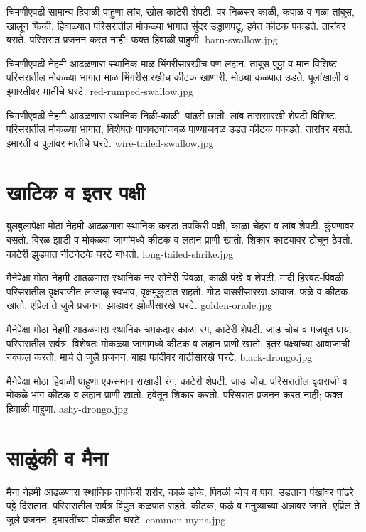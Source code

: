 \documentclass[aspectratio=169]{beamer}
\begin{document}
{चिमणीएवढी}
{सामान्य हिवाळी पाहुणा}
{लांब, खोल काटेरी शेपटी. वर निळसर-काळी, कपाळ व गळा तांबूस, खालून फिकी.}
{हिवाळ्यात परिसरातील मोकळ्या भागात}
{सुंदर उड्डाणपटू, हवेत कीटक पकडते. तारांवर बसते.}
{परिसरात प्रजनन करत नाही; फक्त हिवाळी पाहुणी.}
{barn-swallow.jpg}

{चिमणीएवढी}
{नेहमी आढळणारा स्थानिक}
{माळ भिंगरीसारखीच पण लहान. तांबूस पुठ्ठा व मान विशिष्ट.}
{परिसरातील मोकळ्या भागात}
{माळ भिंगरीसारखीच कीटक खाणारी. मोठ्या कळपात उडते.}
{पूलांखाली व इमारतींवर मातीचे घरटे.}
{red-rumped-swallow.jpg}

{चिमणीएवढी}
{नेहमी आढळणारा स्थानिक}
{निळी-काळी, पांढरी छाती. लांब तारासारखी शेपटी विशिष्ट.}
{परिसरातील मोकळ्या भागात, विशेषतः पाणवठ्यांजवळ}
{पाण्याजवळ उडत कीटक पकडते. तारांवर बसते.}
{इमारती व पुलांवर मातीचे घरटे.}
{wire-tailed-swallow.jpg}

\section{खाटिक व इतर पक्षी}
{बुलबुलापेक्षा मोठा}
{नेहमी आढळणारा स्थानिक}
{करडा-तपकिरी पक्षी, काळा चेहरा व लांब शेपटी. कुंपणावर बसतो.}
{विरळ झाडी व मोकळ्या जागांमध्ये}
{कीटक व लहान प्राणी खातो. शिकार काट्यावर टोचून ठेवतो.}
{काटेरी झुडपात नीटनेटके घरटे बांधतो.}
{long-tailed-shrike.jpg}

{मैनेपेक्षा मोठा}
{नेहमी आढळणारा स्थानिक}
{नर सोनेरी पिवळा, काळी पंखे व शेपटी. मादी हिरवट-पिवळी.}
{परिसरातील वृक्षराजीत}
{लाजाळू स्वभाव, वृक्षमुकुटात राहतो. गोड बासरीसारखा आवाज. फळे व कीटक खातो.}
{एप्रिल ते जुलै प्रजनन. झाडावर झोळीसारखे घरटे.}
{golden-oriole.jpg}

{मैनेपेक्षा मोठा}
{नेहमी आढळणारा स्थानिक}
{चमकदार काळा रंग, काटेरी शेपटी. जाड चोच व मजबूत पाय.}
{परिसरातील सर्वत्र, विशेषतः मोकळ्या जागांमध्ये}
{कीटक व लहान प्राणी खातो. इतर पक्ष्यांच्या आवाजाची नक्कल करतो.}
{मार्च ते जुलै प्रजनन. बाह्य फांदीवर वाटीसारखे घरटे.}
{black-drongo.jpg}

{मैनेपेक्षा मोठा}
{हिवाळी पाहुणा}
{एकसमान राखाडी रंग, काटेरी शेपटी. जाड चोच.}
{परिसरातील वृक्षराजी व मोकळे भाग}
{कीटक व लहान प्राणी खातो. हवेतून शिकार करतो.}
{परिसरात प्रजनन करत नाही; फक्त हिवाळी पाहुणा.}
{ashy-drongo.jpg}

\section{साळुंकी व मैना}
{मैना}
{नेहमी आढळणारा स्थानिक}
{तपकिरी शरीर, काळे डोके, पिवळी चोच व पाय. उडताना पंखांवर पांढरे पट्टे दिसतात.}
{परिसरातील सर्वत्र विपुल}
{कळपात राहते. कीटक, फळे व मनुष्याच्या अन्नावर जगते.}
{एप्रिल ते जुलै प्रजनन. इमारतींच्या पोकळीत घरटे.}
{common-myna.jpg}
\end{document}
